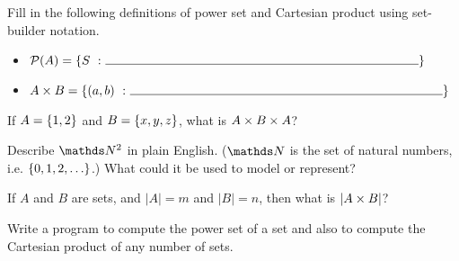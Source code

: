 \begin{exer1}
Fill in the following definitions of power set and Cartesian product using set-builder notation.
\begin{itemize}
\item $\powerset{A} = \setbuild{S}{\line(1,0){250}}$
\item $\setproduct{A}{B} = \setbuild{(a, b)}{\line(1,0){250}}$
\end{itemize}
\end{exer1}

\begin{exer1}
If $A = \left\lbrace 1, 2 \right\rbrace$ and $B = \left\lbrace x ,y, z \right\rbrace$, what is $A \times B \times A$?
\end{exer1}

\begin{exer1}
Describe $\naturals^2$ in plain English. ($\naturals$ is the set of natural numbers, i.e. $\left\lbrace 0, 1, 2, \ldots \right\rbrace$.) What could it be used to model or represent?
\end{exer1}

\begin{exer1}
If $A$ and $B$ are sets, and $|A| = m$ and $|B| = n$, then what is $|A \times B|$?
\end{exer1}

\begin{progexer}\happymac
Write a program to compute the power set of a set and also to compute the Cartesian product of any number of sets.
\end{progexer}
